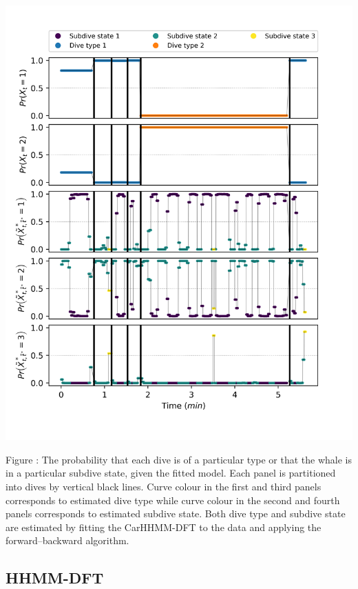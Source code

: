 \documentclass{article}
\begin{document}
        \begin{center}
        \includegraphics[width=6in]{../Plots/2019/20190902-182840-CATs_OB_1_0_267_CarHHMM2_decoded_states.png}
        \end{center}
        
        \noindent Figure : The probability that each dive is of a particular type or that the whale is in a particular subdive state, given the fitted model. Each panel is partitioned into dives by vertical black lines. Curve colour in the first and third panels corresponds to estimated dive type while curve colour in the second and fourth panels corresponds to estimated subdive state. Both dive type and subdive state are estimated by fitting the CarHHMM-DFT to the data and applying the forward--backward algorithm.
        \addtocounter{fignum}{1}
        
        \subsection{HHMM-DFT}
        
\end{document}

